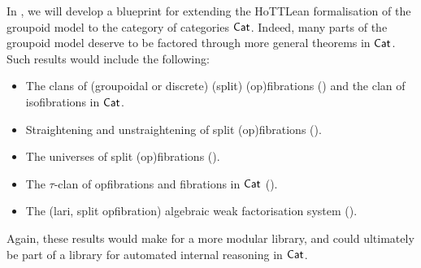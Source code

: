 In ,
we will develop a blueprint
for extending the HoTTLean formalisation of the groupoid model
to the category of categories $\mathsf{Cat}$.
Indeed, many parts of the groupoid model deserve to be factored through
more general theorems in $\mathsf{Cat}$.
Such results would include the following:
\begin{itemize}
  \item The clans of (groupoidal or discrete) (split) (op)fibrations ()
    and the clan of isofibrations in $\mathsf{Cat}$.
  \item Straightening and unstraightening of split (op)fibrations ().
  \item The universes of split (op)fibrations ().
  \item The $\tau$-clan of opfibrations and fibrations in $\mathsf{Cat}$ ().
  \item The (lari, split opfibration) algebraic weak factorisation system ().
\end{itemize}
Again, these results would make for a more modular library,
and could ultimately be part of a library for automated internal reasoning in $\mathsf{Cat}$.